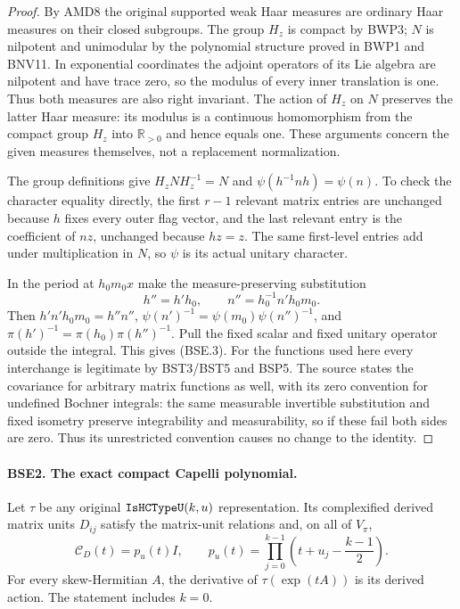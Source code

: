 \documentclass[11pt,a4paper]{article}
\numberwithin{equation}{section}
\theoremstyle{remark}\newtheorem{remark}[theorem]{Remark}
\begin{document}
\begin{proof}
By AMD8 the original supported weak Haar measures are ordinary Haar
measures on their closed subgroups.  The group $H_z$ is compact by
BWP3; $N$ is nilpotent and unimodular by the polynomial structure
proved in BWP1 and BNV11.  In exponential coordinates the adjoint
operators of its Lie algebra are nilpotent and have trace zero,
so the modulus of every inner translation is one.  Thus both
measures are also right invariant.
The action of $H_z$ on $N$ preserves the latter Haar measure:
its modulus is a continuous homomorphism from the compact group
$H_z$ into $\mathbb R_{>0}$ and hence equals one.
These arguments concern the given measures themselves, not a
replacement normalization.

The group definitions give $H_zNH_z^{-1}=N$ and
$\psi(h^{-1}nh)=\psi(n)$.  To check the character equality directly,
the first $r-1$ relevant matrix entries are unchanged because
$h$ fixes every outer flag vector, and the last relevant entry
is the coefficient of $nz$, unchanged because $hz=z$.
The same first-level entries add under multiplication in $N$,
so $\psi$ is its actual unitary character.

In the period at $h_0m_0x$ make the measure-preserving substitution
\[
             h''=h'h_0,\qquad
             n''=h_0^{-1}n'h_0m_0.
 \tag{BSE.4}
\]
Then $h'n'h_0m_0=h''n''$,
$\psi(n')^{-1}=\psi(m_0)\psi(n'')^{-1}$, and
$\pi(h')^{-1}=\pi(h_0)\pi(h'')^{-1}$.
Pull the fixed scalar and fixed unitary operator outside the
integral.  This gives (BSE.3).
For the functions used here every interchange is legitimate by
BST3/BST5 and BSP5.  The source states the covariance for arbitrary
matrix functions as well, with its zero convention for undefined
Bochner integrals: the same measurable invertible substitution and
fixed isometry preserve integrability and measurability, so if these
fail both sides are zero.  Thus its unrestricted convention causes
no change to the identity.
\end{proof}

\paragraph{BSE2. The exact compact Capelli polynomial.}
\label{claim:BSE2}
Let $\tau$ be any original $\texttt{Is\allowbreak HCType\allowbreak U}(k,u)$ representation.
Its complexified derived matrix units $D_{ij}$ satisfy the
matrix-unit relations and, on all of $V_\pi$,
\[
 \mathcal C_D(t)=p_u(t)I,\qquad
 p_u(t)=\prod_{j=0}^{k-1}
               \left(t+u_j-\frac{k-1}{2}\right).
 \tag{BSE.5}
\]
For every skew-Hermitian $A$, the derivative of
$\tau(\exp(tA))$ is its derived action.  The statement includes $k=0$.
\end{document}

